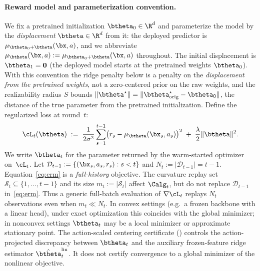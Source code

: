 \paragraph{Reward model and parameterization convention.}
We fix a pretrained initialization $\btheta_0\in\R^d$ and parameterize the model
by the \emph{displacement} $\btheta\in\R^d$ from it: the deployed predictor is
$\mu_{\btheta_0+\btheta}(\bx,a)$, and we abbreviate
$\mu_{\btheta}(\bx,a):=\mu_{\btheta_0+\btheta}(\bx,a)$ throughout.  The initial
displacement is $\btheta_1=\mathbf 0$ (the deployed model starts at the pretrained
weights $\btheta_0$).  With this convention the ridge penalty below is a penalty
on the \emph{displacement from the pretrained weights}, not a zero-centered prior
on the raw weights, and the realizability radius $S$ bounds
$\|\btheta^\star\|=\|\btheta^\star_{\mathrm{orig}}-\btheta_0\|$, the distance of
the true parameter from the pretrained initialization.
Define the regularized loss at round~$t$:
\begin{equation}\label{eq:erm}
  \cL_t(\btheta)
  \;:=\;
    \frac{1}{2\sigma^2}\sum_{s=1}^{t-1}
      \bigl(r_s - \mu_{\btheta}(\bx_s,a_s)\bigr)^2
    \;+\; \frac{\lambda}{2}\|\btheta\|^2 .
\end{equation}
We write $\btheta_t$ for the parameter returned by the warm-started
optimizer on~$\cL_t$.
Let $\mathcal D_{t-1}:=\{(\bx_s,a_s,r_s):s<t\}$ and
$N_t:=|\mathcal D_{t-1}|=t-1$.  Equation~\eqref{eq:erm} is a
\emph{full-history} objective.  The curvature replay set
$\mathcal S_t\subseteq\{1,\ldots,t-1\}$ and its size
$m_t:=|\mathcal S_t|$ affect $\Calg_t$, but do not replace
$\mathcal D_{t-1}$ in~\eqref{eq:erm}.  Thus a generic full-batch evaluation of
$\nabla\cL_t$ replays $N_t$ observations even when $m_t\ll N_t$.
In convex settings (e.g.\ a frozen backbone with a linear head), under exact
optimization this coincides with the global minimizer; in nonconvex settings $\btheta_t$
may be a local minimizer or approximate stationary point.
The action-scaled centering certificate () controls the
action-projected discrepancy between $\btheta_t$ and the auxiliary
frozen-feature ridge estimator $\hat\btheta_t^{\mathrm{lin}}$.  It does
not certify convergence to a global minimizer of the nonlinear objective.

